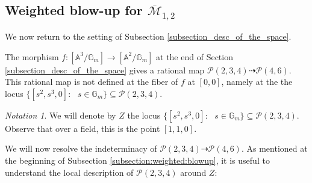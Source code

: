 \documentclass[11pt]{amsart}
\theoremstyle{definition}
\theoremstyle{remark}
\newtheorem{notation}{Notation}
\newcommand{\bA}{{\mathbb A}}
\newcommand{\calM}{\mathcal M}
\newcommand{\calP}{\mathcal P}
\newcommand{\bG}{\mathbb{G}}
\begin{document}
\subsection{Weighted blow-up for $\overline{\calM}_{1,2}$} We now return to the setting of Subsection \ref{subsection_desc_of_the_space}.

The morphism $f:[\bA^3/\bG_m]\to [\bA^2/\bG_m]$ at the end of Section \ref{subsection_desc_of_the_space} gives a rational map $\calP(2,3,4)\dashrightarrow \calP(4,6).$ This rational map is not defined at the fiber of $f$ at $[0,0]$, namely at the the locus $\{[  s^2, s^3, 0]: \text{ }s\in \bG_m\} \subseteq \calP(2,3,4)$. 
\begin{notation}\label{notation_point_z}
We will denote by $Z$ the locus $\{[  s^2, s^3, 0]: \text{ }s\in \bG_m\} \subseteq \calP(2,3,4)$. Observe that over a field, this is the point $[1,1,0]$.
\end{notation}
We will now resolve the indeterminacy of $\calP(2,3,4)\dashrightarrow \calP(4,6)$. As mentioned at the beginning of Subsection \ref{subsection:weighted:blowup}, it is useful to understand the local description of $\calP(2,3,4)$ around $Z$:
\end{document}
